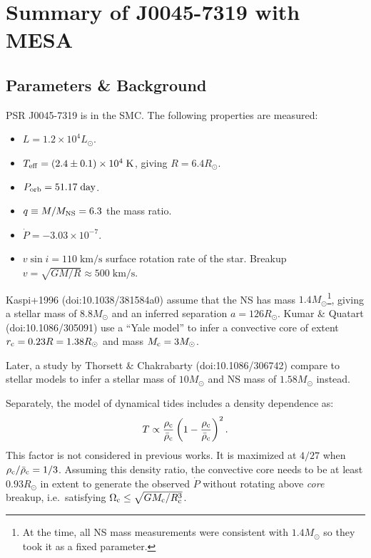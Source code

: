 \documentclass[11pt,
        usenames, %
        dvipsnames %
    ]{article}
\newcommand*{\scinot}[2]{#1\times10^{#2}}
\newcommand*{\p}[1]{\left(#1\right)}
\begin{document}
\section{Summary of J0045-7319 with MESA} %

\subsection{Parameters \& Background}

PSR J0045-7319 is in the SMC\@. %
The following properties are measured:
\begin{itemize}
    \item $L = \scinot{1.2}{4}L_{\odot}$.
    \item $T_{\rm eff} = \p{2.4 \pm 0.1} \times 10^4 \;\mathrm{K}$, giving $R =
        6.4R_{\odot}$.
    \item $P_{\rm orb} = 51.17\;\mathrm{day}$.
    \item $q \equiv M / M_{\rm NS} = 6.3$ the mass ratio.
    \item $\dot{P} = \scinot{-3.03}{-7}$.
    \item $v \sin i = 110\;\mathrm{km/s}$ surface rotation rate of the star.
        Breakup $v = \sqrt{GM/R} \approx 500\;\mathrm{km/s}$.
\end{itemize}

Kaspi+1996 (doi:10.1038/381584a0) assume that the NS has mass $1.4
M_{\odot}$\footnote{At the time, all NS mass measurements were consistent with
$1.4M_{\odot}$ so they took it as a fixed parameter.}, giving a stellar mass of
$8.8M_{\odot}$ and an inferred separation $a = 126R_{\odot}$. Kumar \& Quatart
(doi:10.1086/305091) use a ``Yale model'' to infer a convective core of extent
$r_{\rm c} = 0.23R = 1.38R_{\odot}$ and mass $M_{\rm c} = 3M_{\odot}$.

Later, a study by Thorsett \& Chakrabarty (doi:10.1086/306742) compare to
stellar models to infer a stellar mass of $10M_{\odot}$ and NS mass of
$1.58M_{\odot}$ instead.

Separately, the model of dynamical tides includes a density dependence as:
\begin{equation}
    T \propto \frac{\rho_{\rm c}}{\bar{\rho}_{\rm c}}\p{1 - \frac{\rho_{\rm
    c}}{\bar{\rho}_{\rm c}}}^2.
\end{equation}
This factor is not considered in previous works. It is maximized at $4/27$ when
$\rho_{\rm c} / \bar{\rho}_{\rm c} = 1/3$. Assuming this density ratio, the
convective core needs to be at least $0.93R_{\odot}$ in extent to generate the
observed $\dot{P}$ without rotating above \emph{core} breakup, i.e.\ satisfying
$\Omega_{\rm c} \leq \sqrt{GM_{\rm c} / R_{\rm c}^3}$.
\end{document}
